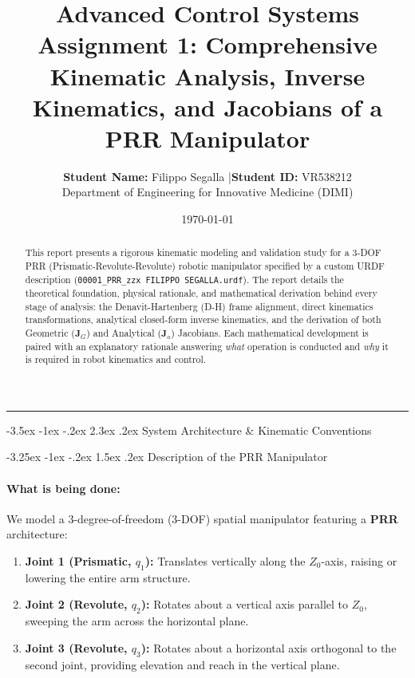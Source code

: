 \documentclass[11pt, a4paper]{article}
\title{
    \vspace{-1cm}
    \color{brandblue}\textbf{Advanced Control Systems}\\[0.3em]
    \Large\textbf{Assignment 1: Comprehensive Kinematic Analysis, Inverse Kinematics, and Jacobians of a PRR Manipulator}
}
\author{\textbf{Student Name:} Filippo Segalla \quad|\quad \textbf{Student ID:} VR538212\\[0.2em]
\small Department of Engineering for Innovative Medicine (DIMI) }
\date{\today}
\makeatletter
\renewcommand{\section}{\@startsection{section}{1}{\z@}%
    {-3.5ex \@plus -1ex \@minus -.2ex}%
    {2.3ex \@plus .2ex}%
    {\normalfont\Large\bfseries\color{brandblue}}}
\renewcommand{\subsection}{\@startsection{subsection}{2}{\z@}%
    {-3.25ex \@plus -1ex \@minus -.2ex}%
    {1.5ex \@plus .2ex}%
    {\normalfont\large\bfseries\color{brandaccent}}}
\makeatother
\begin{document}
\maketitle
\thispagestyle{empty}

\begin{abstract}
\noindent 
This report presents a rigorous kinematic modeling and validation study for a 3-DOF PRR (Prismatic-Revolute-Revolute) robotic manipulator specified by a custom URDF description (\texttt{00001\_PRR\_zzx FILIPPO SEGALLA.urdf}). The report details the theoretical foundation, physical rationale, and mathematical derivation behind every stage of analysis: the Denavit-Hartenberg (D-H) frame alignment, direct kinematics transformations, analytical closed-form inverse kinematics, and the derivation of both Geometric ($\mathbf{J}_G$) and Analytical ($\mathbf{J}_a$) Jacobians. Each mathematical development is paired with an explanatory rationale answering \emph{what} operation is conducted and \emph{why} it is required in robot kinematics and control.
\end{abstract}

\hrule
\vspace{1.5em}

\section{System Architecture \& Kinematic Conventions}

\subsection{Description of the PRR Manipulator}
\paragraph{What is being done:}
We model a 3-degree-of-freedom (3-DOF) spatial manipulator featuring a \textbf{PRR} architecture:
\begin{enumerate}[leftmargin=1.5em]
    \item \textbf{Joint 1 (Prismatic, $q_1$):} Translates vertically along the $Z_0$-axis, raising or lowering the entire arm structure.
    \item \textbf{Joint 2 (Revolute, $q_2$):} Rotates about a vertical axis parallel to $Z_0$, sweeping the arm across the horizontal plane.
    \item \textbf{Joint 3 (Revolute, $q_3$):} Rotates about a horizontal axis orthogonal to the second joint, providing elevation and reach in the vertical plane.
\end{enumerate}
\end{document}
